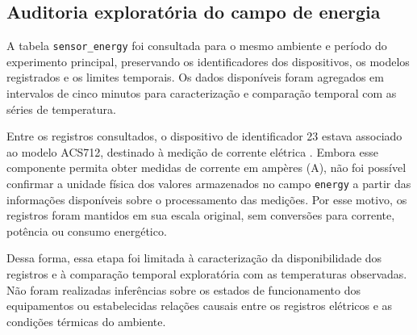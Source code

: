 \subsection{Auditoria exploratória do campo de energia}
\label{subsec:metodologia_energia}

A tabela \texttt{sensor\_energy} foi consultada para o mesmo ambiente
e período do experimento principal, preservando os identificadores
dos dispositivos, os modelos registrados e os limites temporais.
Os dados disponíveis foram agregados em intervalos de cinco minutos
para caracterização e comparação temporal com as séries de temperatura.

Entre os registros consultados, o dispositivo de identificador 23
estava associado ao modelo ACS712, destinado à medição de corrente
elétrica \cite{allegroacs712}. Embora esse componente permita obter
medidas de corrente em ampères (A), não foi possível confirmar a
unidade física dos valores armazenados no campo \texttt{energy}
a partir das informações disponíveis sobre o processamento das
medições. Por esse motivo, os registros foram mantidos em sua escala
original, sem conversões para corrente, potência ou consumo energético.

Dessa forma, essa etapa foi limitada à caracterização da
disponibilidade dos registros e à comparação temporal exploratória
com as temperaturas observadas. Não foram realizadas inferências
sobre os estados de funcionamento dos equipamentos ou estabelecidas
relações causais entre os registros elétricos e as condições
térmicas do ambiente.




